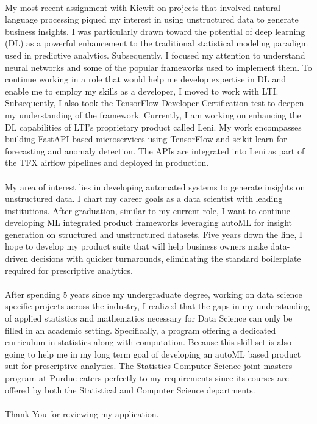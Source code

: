 \documentclass[letterpaper]{article}
\begin{document}
\paragraph{}
My most recent assignment with Kiewit on projects that involved natural language processing piqued my interest in using unstructured data to generate business insights. I was particularly drawn toward the potential of deep learning (DL) as a powerful enhancement to the traditional statistical modeling paradigm used in predictive analytics. Subsequently, I focused my attention to understand neural networks and some of the popular frameworks used to implement them. To continue working in a role that would help me develop expertise in DL and enable me to employ my skills as a developer, I moved to work with LTI. Subsequently, I also took the TensorFlow Developer Certification test to deepen my understanding of the framework. Currently, I am working on enhancing the DL capabilities of LTI’s proprietary product called Leni. My work encompasses building FastAPI based microservices using TensorFlow and scikit-learn for forecasting and anomaly detection. The APIs are integrated into Leni as part of the TFX airflow pipelines and deployed in production.

\paragraph{}
My area of interest lies in developing automated systems to generate insights on unstructured data. I chart my career goals as a data scientist with leading institutions. After graduation, similar to my current role, I want to continue developing ML integrated product frameworks leveraging autoML for insight generation on structured and unstructured datasets. Five years down the line, I hope to develop my product suite that will help business owners make data-driven decisions with quicker turnarounds, eliminating the standard boilerplate required for prescriptive analytics.

\paragraph{}
After spending 5 years since my undergraduate degree, working on data science specific projects across the
industry, I realized that the gaps in my understanding of applied statistics and mathematics necessary for
Data Science can only be filled in an academic setting. Specifically, a program offering a dedicated curriculum
in statistics along with computation. Because this skill set is also going to help me in my long term goal of
developing an autoML based product suit for prescriptive analytics. The Statistics-Computer Science joint masters program at Purdue caters perfectly to my requirements since its courses are offered by both the Statistical
and Computer Science departments.

\paragraph{}
 Thank You for reviewing my application.

  
\end{document}
